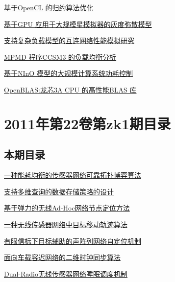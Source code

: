\documentclass[a4paper]{article}
\begin{document}
\href{http://www.jos.org.cn/ch/reader/download_pdf.aspx?file_no=11037&year_id=2011&quarter_id=zk2&falg=1}{基于OpenCL 的归约算法优化}

\href{http://www.jos.org.cn/ch/reader/download_pdf.aspx?file_no=11038&year_id=2011&quarter_id=zk2&falg=1}{基于GPU 应用于大规模星模拟器的灰度弥散模型}

\href{http://www.jos.org.cn/ch/reader/download_pdf.aspx?file_no=11039&year_id=2011&quarter_id=zk2&falg=1}{支持复杂负载模型的互连网络性能模拟研究}

\href{http://www.jos.org.cn/ch/reader/download_pdf.aspx?file_no=11040&year_id=2011&quarter_id=zk2&falg=1}{MPMD 程序CCSM3 的负载均衡分析}

\href{http://www.jos.org.cn/ch/reader/download_pdf.aspx?file_no=11041&year_id=2011&quarter_id=zk2&falg=1}{基于NInO 模型的大规模计算系统功耗控制}

\href{http://www.jos.org.cn/ch/reader/download_pdf.aspx?file_no=11042&year_id=2011&quarter_id=zk2&falg=1}{OpenBLAS:龙芯3A CPU 的高性能BLAS 库}


\section{\textbf{2011年第22卷第zk1期目录}}
\subsection{本期目录}
\href{http://www.jos.org.cn/ch/reader/download_pdf.aspx?file_no=11001&year_id=2011&quarter_id=zk1&falg=1}{一种能耗均衡的传感器网络可靠拓扑博弈算法}

\href{http://www.jos.org.cn/ch/reader/download_pdf.aspx?file_no=11002&year_id=2011&quarter_id=zk1&falg=1}{支持多维查询的数据存储策略的设计}

\href{http://www.jos.org.cn/ch/reader/download_pdf.aspx?file_no=11003&year_id=2011&quarter_id=zk1&falg=1}{基于弹力的无线Ad-Hoc网络节点定位方法}

\href{http://www.jos.org.cn/ch/reader/download_pdf.aspx?file_no=11004&year_id=2011&quarter_id=zk1&falg=1}{一种无线传感器网络中目标移动轨迹算法}

\href{http://www.jos.org.cn/ch/reader/download_pdf.aspx?file_no=11005&year_id=2011&quarter_id=zk1&falg=1}{有限信标下目标辅助的声阵列网络自定位机制}

\href{http://www.jos.org.cn/ch/reader/download_pdf.aspx?file_no=11006&year_id=2011&quarter_id=zk1&falg=1}{面向车载容迟网络的二维时钟同步算法}

\href{http://www.jos.org.cn/ch/reader/download_pdf.aspx?file_no=11007&year_id=2011&quarter_id=zk1&falg=1}{Dual-Radio无线传感器网络睡眠调度机制}
\end{document}
